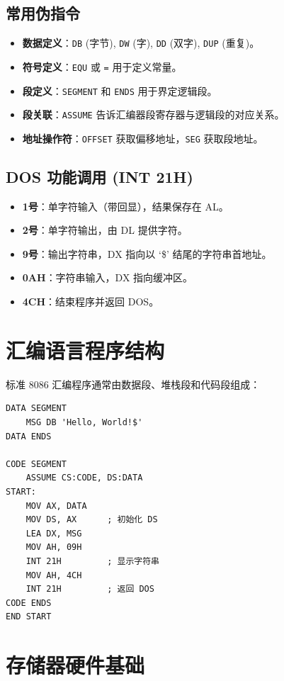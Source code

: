 \documentclass[12pt,a4paper]{ctexart}
\begin{document}
\subsection{常用伪指令}
\begin{itemize}
    \item \textbf{数据定义}：\texttt{DB} (字节), \texttt{DW} (字), \texttt{DD} (双字), \texttt{DUP} (重复)。
    \item \textbf{符号定义}：\texttt{EQU} 或 \texttt{=} 用于定义常量。
    \item \textbf{段定义}：\texttt{SEGMENT} 和 \texttt{ENDS} 用于界定逻辑段。
    \item \textbf{段关联}：\texttt{ASSUME} 告诉汇编器段寄存器与逻辑段的对应关系。
    \item \textbf{地址操作符}：\texttt{OFFSET} 获取偏移地址，\texttt{SEG} 获取段地址。
\end{itemize}

\subsection{DOS 功能调用 (INT 21H)}
\begin{itemize}
    \item \textbf{1号}：单字符输入（带回显），结果保存在 AL。
    \item \textbf{2号}：单字符输出，由 DL 提供字符。
    \item \textbf{9号}：输出字符串，DX 指向以 `\$' 结尾的字符串首地址。
    \item \textbf{0AH}：字符串输入，DX 指向缓冲区。
    \item \textbf{4CH}：结束程序并返回 DOS。
\end{itemize}

\section{汇编语言程序结构}
标准 8086 汇编程序通常由数据段、堆栈段和代码段组成：
\begin{lstlisting}[language={[x86masm]Assembler}, basicstyle=\ttfamily\small]
DATA SEGMENT
    MSG DB 'Hello, World!$'
DATA ENDS

CODE SEGMENT
    ASSUME CS:CODE, DS:DATA
START:
    MOV AX, DATA
    MOV DS, AX      ; 初始化 DS
    LEA DX, MSG
    MOV AH, 09H
    INT 21H         ; 显示字符串
    MOV AH, 4CH
    INT 21H         ; 返回 DOS
CODE ENDS
END START
\end{lstlisting}

\section{存储器硬件基础}
\end{document}
